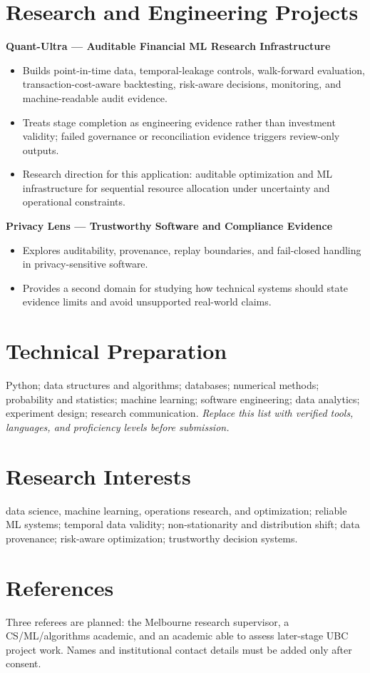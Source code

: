 \documentclass[11pt]{article}
\begin{document}
\section*{Research and Engineering Projects}
\textbf{Quant-Ultra --- Auditable Financial ML Research Infrastructure}
\begin{itemize}
\item Builds point-in-time data, temporal-leakage controls, walk-forward evaluation, transaction-cost-aware backtesting, risk-aware decisions, monitoring, and machine-readable audit evidence.
\item Treats stage completion as engineering evidence rather than investment validity; failed governance or reconciliation evidence triggers review-only outputs.
\item Research direction for this application: auditable optimization and ML infrastructure for sequential resource allocation under uncertainty and operational constraints.
\end{itemize}

\begin{samepage}
\textbf{Privacy Lens --- Trustworthy Software and Compliance Evidence}
\begin{itemize}
\item Explores auditability, provenance, replay boundaries, and fail-closed handling in privacy-sensitive software.
\item Provides a second domain for studying how technical systems should state evidence limits and avoid unsupported real-world claims.
\end{itemize}
\end{samepage}

\section*{Technical Preparation}
Python; data structures and algorithms; databases; numerical methods; probability and statistics; machine learning; software engineering; data analytics; experiment design; research communication. \textit{Replace this list with verified tools, languages, and proficiency levels before submission.}

\section*{Research Interests}
data science, machine learning, operations research, and optimization; reliable ML systems; temporal data validity; non-stationarity and distribution shift; data provenance; risk-aware optimization; trustworthy decision systems.

\section*{References}
Three referees are planned: the Melbourne research supervisor, a CS/ML/algorithms academic, and an academic able to assess later-stage UBC project work. Names and institutional contact details must be added only after consent.
\end{document}
